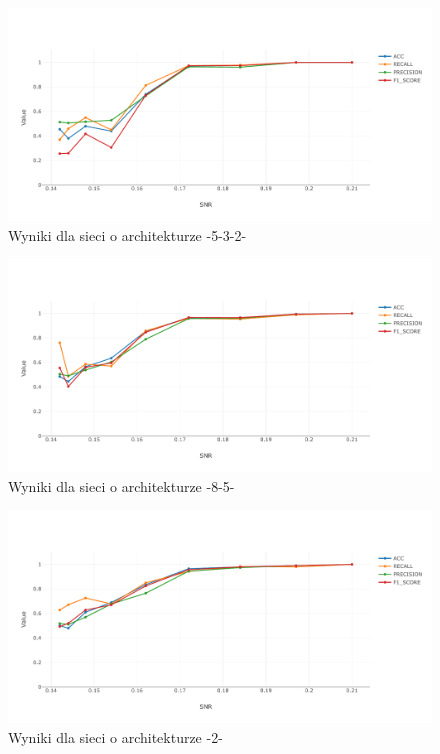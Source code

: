 \documentclass[inzynierska]{pwr_wmat_praca_dyplomowa}
\theoremstyle{plain}
\numberwithin{theorem}{chapter}
\theoremstyle{definition}
\numberwithin{theorem}{chapter}
\begin{document}
\begin{figure}[ht]
	\centering
	\includegraphics[width=14cm]{images/snr_to_acc532.pdf}
	\caption{Wyniki dla sieci o architekturze -5-3-2-}
	\label{wynik2-est-5-3-2}
\end{figure}
\begin{figure}[ht]
	\centering
	\includegraphics[width=14cm]{images/snr_to_acc85.pdf}
	\caption{Wyniki dla sieci o architekturze -8-5-}
	\label{wynik-est-8-5}
\end{figure}
\begin{figure}[ht]
	\centering
	\includegraphics[width=14cm]{images/snr_to_acc2.pdf}
	\caption{Wyniki dla sieci o architekturze -2-}
	\label{wynik-est-2}
\end{figure}
\end{document}
